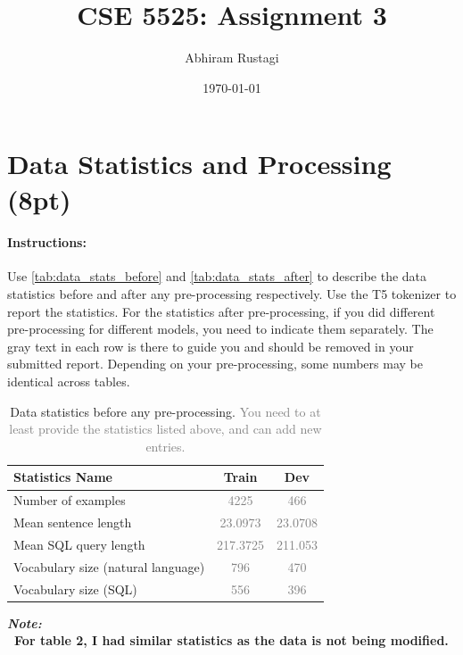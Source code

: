 \documentclass{article}
\title{CSE 5525: Assignment 3}
\author{Abhiram Rustagi}
\date{\today}
\begin{document}
\maketitle


\section{Data Statistics and Processing (8pt)}
\paragraph{Instructions:} Use \autoref{tab:data_stats_before} and \autoref{tab:data_stats_after} to describe the data statistics before and after any pre-processing respectively. 
Use the T5 tokenizer to report the statistics. 
For the statistics after pre-processing, if you did different pre-processing for different models, you need to indicate them separately.
The gray text in each row is there to guide you and should be removed in your submitted report.
Depending on your pre-processing, some numbers may be identical across tables. 

\begin{table}[h!]
\centering
\begin{tabular}{lcc}
\toprule
Statistics Name & Train & Dev \\
\midrule
Number of examples & \textcolor{gray}{4225} & \textcolor{gray}{466} \\
Mean sentence length & \textcolor{gray}{23.0973}& \textcolor{gray}{23.0708} \\
Mean SQL query length & \textcolor{gray}{217.3725}& \textcolor{gray}{211.053}  \\
Vocabulary size (natural language)& \textcolor{gray}{796}& \textcolor{gray}{470}  \\
Vocabulary size (SQL)& \textcolor{gray}{556}& \textcolor{gray}{396}  \\
\bottomrule
\end{tabular}
\caption{Data statistics before any pre-processing. \textcolor{gray}{You need to at least provide the statistics listed above, and can add new entries.}}
\label{tab:data_stats_before}
\end{table}

\textbf{\textit{Note:} \\\ For table 2, I had similar statistics as the data is not being modified.}
\end{document}
